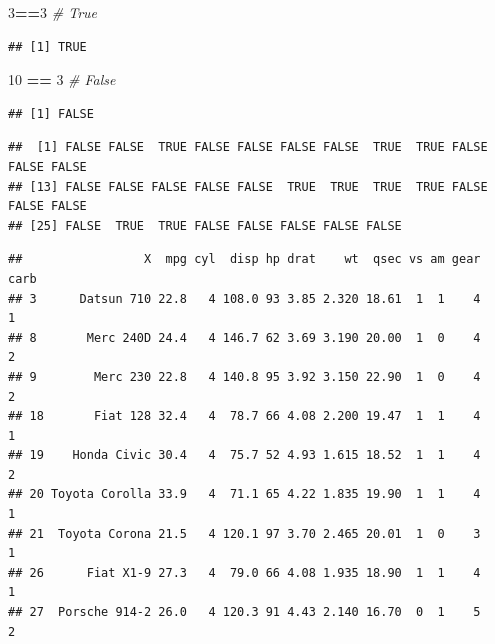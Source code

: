 \documentclass[
]{article}
\newenvironment{Shaded}{\begin{snugshade}}{\end{snugshade}}
\newcommand{\CommentTok}[1]{\textcolor[rgb]{0.56,0.35,0.01}{\textit{#1}}}
\newcommand{\DecValTok}[1]{\textcolor[rgb]{0.00,0.00,0.81}{#1}}
\newcommand{\NormalTok}[1]{#1}
\newcommand{\SpecialCharTok}[1]{\textcolor[rgb]{0.81,0.36,0.00}{\textbf{#1}}}
\begin{document}
\begin{Shaded}
\begin{Highlighting}[]
\DecValTok{3}\SpecialCharTok{==}\DecValTok{3} \CommentTok{\# True}
\end{Highlighting}
\end{Shaded}

\begin{verbatim}
## [1] TRUE
\end{verbatim}

\begin{Shaded}
\begin{Highlighting}[]
\DecValTok{10} \SpecialCharTok{==} \DecValTok{3} \CommentTok{\# False}
\end{Highlighting}
\end{Shaded}

\begin{verbatim}
## [1] FALSE
\end{verbatim}

\begin{Shaded}
\end{Shaded}

\begin{verbatim}
##  [1] FALSE FALSE  TRUE FALSE FALSE FALSE FALSE  TRUE  TRUE FALSE FALSE FALSE
## [13] FALSE FALSE FALSE FALSE FALSE  TRUE  TRUE  TRUE  TRUE FALSE FALSE FALSE
## [25] FALSE  TRUE  TRUE FALSE FALSE FALSE FALSE FALSE
\end{verbatim}

\begin{Shaded}
\end{Shaded}

\begin{verbatim}
##                 X  mpg cyl  disp hp drat    wt  qsec vs am gear carb
## 3      Datsun 710 22.8   4 108.0 93 3.85 2.320 18.61  1  1    4    1
## 8       Merc 240D 24.4   4 146.7 62 3.69 3.190 20.00  1  0    4    2
## 9        Merc 230 22.8   4 140.8 95 3.92 3.150 22.90  1  0    4    2
## 18       Fiat 128 32.4   4  78.7 66 4.08 2.200 19.47  1  1    4    1
## 19    Honda Civic 30.4   4  75.7 52 4.93 1.615 18.52  1  1    4    2
## 20 Toyota Corolla 33.9   4  71.1 65 4.22 1.835 19.90  1  1    4    1
## 21  Toyota Corona 21.5   4 120.1 97 3.70 2.465 20.01  1  0    3    1
## 26      Fiat X1-9 27.3   4  79.0 66 4.08 1.935 18.90  1  1    4    1
## 27  Porsche 914-2 26.0   4 120.3 91 4.43 2.140 16.70  0  1    5    2
\end{verbatim}
\end{document}
